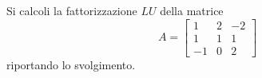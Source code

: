 Si calcoli la fattorizzazione $LU$ della matrice
\[
A=\left[
\begin{array}{ccc}
1 & 2 & -2 \\
1 & 1 & 1\\
-1 & 0 & 2
\end{array}\right]
\]
\noindent riportando lo svolgimento. 



